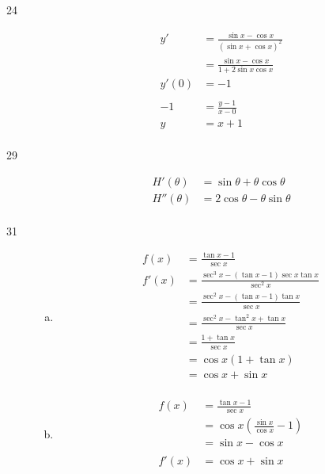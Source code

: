 \documentclass[letterpaper, landscape]{exam}
\begin{document}
\begin{description}
    \item[24] 
      \begin{align*}
        y'    & = \frac{\sin x - \cos x}{(\sin x + \cos x)^2} \\
              & = \frac{\sin x - \cos x}{1 + 2 \sin x \cos x} \\
        y'(0) & = -1 \\
         \\
        -1 & = \frac{y - 1}{x - 0} \\
        y  & = x + 1 \\
      \end{align*}

    \item[29] 
      \begin{align*}
        H'(\theta)  & = \boxed{ \sin \theta + \theta \cos \theta } \\
        H''(\theta) & = \boxed{ 2 \cos \theta - \theta \sin \theta } \\
      \end{align*}

    \item[31] 
      \begin{enumerate}[(a)]
        \item 
          \begin{align*}
            f(x)  & = \frac{\tan x - 1}{\sec x} \\
            f'(x) & = \frac{\sec^3 x - (\tan x - 1) \sec x \tan x}{\sec^2 x} \\
                  & = \frac{\sec^2 x - (\tan x - 1) \tan x}{\sec x} \\
                  & = \frac{\sec^2 x - \tan^2 x + \tan x}{\sec x} \\
                  & = \frac{1 + \tan x}{\sec x} \\
                  & = \cos x (1 + \tan x) \\
                  & = \cos x + \sin x \\
          \end{align*}

        \item
          \begin{align*}
            f(x)  & = \frac{\tan x - 1}{\sec x} \\
                  & = \cos x \left( \frac{\sin x}{\cos x} - 1 \right) \\
                  & = \sin x - \cos x \\
            \\
            f'(x) & = \cos x + \sin x \\
          \end{align*}
      \end{enumerate}


\end{description}
\end{document}
